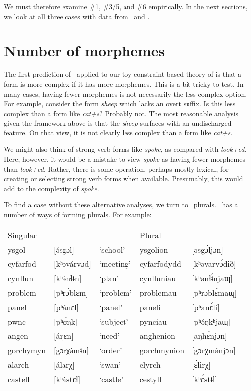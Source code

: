 \documentclass[output=paper,
modfonts
]{LSP/langsci}
\begin{document}
We must therefore examine \#1, \#3/5, and \#6 empirically. In the next sections, we look at all three cases with data from \e\ and \w.

\section{Number of morphemes}

The first prediction of \io\ applied to our toy constraint-based theory of  is that a form is more complex if it has more morphemes. This is a bit tricky to test. In many cases, having fewer morphemes is not necessarily the less complex option. For example, consider the  form \emph{sheep} which lacks an overt  suffix. Is this less complex than a form like \emph{cat+s}? Probably not. The most reasonable analysis given the framework above is that the  \emph{sheep} surfaces with an undischarged  feature. On that view, it is not clearly less complex than a form like \emph{cat+s}.

We might also think of strong verb forms like \emph{spoke}, as compared with \emph{look+ed}. Here, however, it would be a mistake to view \emph{spoke} as having fewer morphemes than \emph{look+ed}. Rather, there is some operation, perhaps mostly lexical, for creating or selecting strong verb forms when available. Presumably, this would add to the complexity of \emph{spoke}.

To find a case without these alternative analyses, we turn to \w\ plurals. \w\ has a number of ways of forming plurals. For example:

\ea
\small
\begin{tabular}[t]{lllll}
Singular  &             &           & Plural \\
ysgol     & [ə́sgɔl]     & `school'  & ysgolion    & [əsgɔ́ljɔn] \\
cyfarfod  & [kʰəvárvɔd] & `meeting' & cyfarfodydd & [kʰəvarvɔ́dɨð] \\
cynllun   & [kʰə́nɬɨn]   & `plan'    & cynlluniau  & [kʰənɬɨ́njaɰ] \\
problem   & [pʰrɔ́blɛm]  & `problem' & problemau   & [pʰrɔblɛ́maɰ] \\
panel     & [pʰánɛl]    & `panel'   & paneli      & [pʰanɛ́li] \\
pwnc      & [pʰʊ́ŋk]     & `subject' & pynciau     & [pʰə́ŋkʰjaɰ] \\
angen     & [áŋɛn]      & `need'    & anghenion   & [aŋhɛ́njɔn] \\
gorchymyn & [gɔrχə́mɨn]  & `order'   & gorchmynion & [gɔrχmə́njɔn] \\
alarch    & [álarχ]     & `swan'    & elyrch      & [ɛ́lɨrχ] \\
castell   & [kʰástɛɬ]   & `castle'  & cestyll     & [kʰɛ́stɨɬ] \\
\end{tabular}
\z
\end{document}
